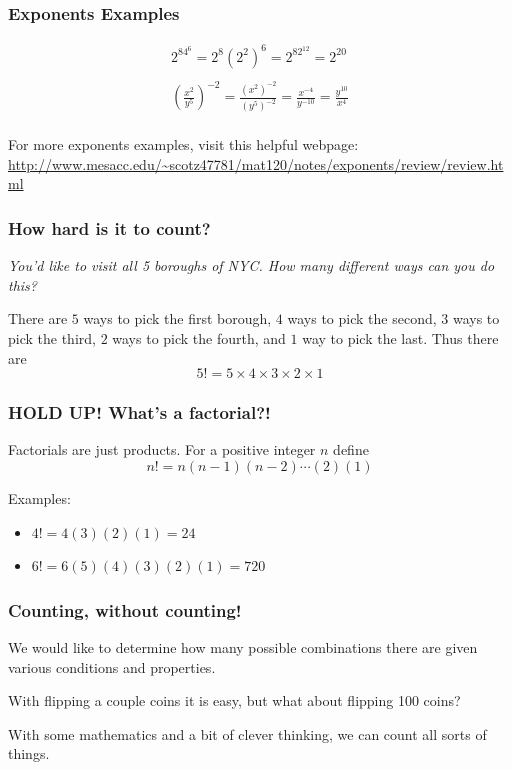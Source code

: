 \documentclass{beamer}
\newcommand{\<}{\langle}
\renewcommand{\>}{\rangle}
\begin{document}
\begin{frame}
\frametitle{Exponents Examples}

\begin{align*}
2^84^6 = 2^8(2^2)^6 = 2^82^{12} = 2^{20}\\
\\
\left(\frac{x^2}{y^5}\right)^{-2} = \frac{(x^2)^{-2}}{(y^5)^{-2}} = \frac{x^{-4}}{y^{-10}} = \frac{y^{10}}{x^4}\\
\end{align*}

For more exponents examples, visit this helpful webpage:
\url{http://www.mesacc.edu/~scotz47781/mat120/notes/exponents/review/review.html}
\end{frame}


\begin{frame}
\frametitle{How hard is it to count?}

\emph{You'd like to visit all 5 boroughs of NYC. How many different ways can you do this?}
\newline

\pause

There are $5$ ways to pick the first borough, $4$ ways to pick the second, $3$ ways to pick the third, $2$ ways to pick the fourth, and $1$ way to pick the last. Thus there are
\[
5! = 5 \times 4 \times 3 \times 2 \times 1
\]

\end{frame}


\begin{frame}
\frametitle{HOLD UP! What's a factorial?!}

Factorials are just products. For a positive integer $n$ define
\[
n! = n(n-1)(n-2)\cdots(2)(1)
\]

Examples:
\begin{itemize}
\item $4! = 4(3)(2)(1) = 24$
\item $6! = 6(5)(4)(3)(2)(1) = 720$
\end{itemize}
\end{frame}



\begin{frame}
\frametitle{Counting, without counting!}

We would like to determine how many possible combinations there are given various conditions and properties. \newline

With flipping a couple coins it is easy, but what about flipping 100 coins? \newline

With some mathematics and a bit of clever thinking, we can count all sorts of things. 
\end{frame}
\end{document}
